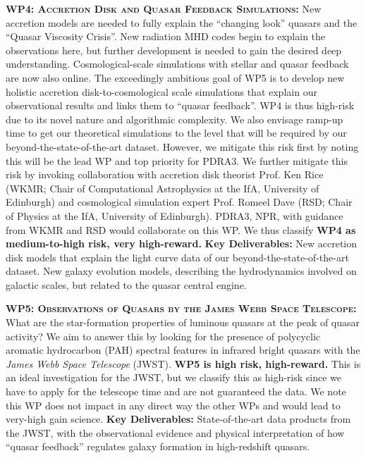 \documentclass[oneside, a4paper, onecolumn, 11pt]{article}
\begin{document}
\smallskip
\smallskip
\noindent
\textbf{\textsc{WP4: Accretion Disk and Quasar Feedback Simulations:}} 
New accretion models are needed to fully explain the ``changing look''
quasars and the ``Quasar Viscosity Crisis''. New radiation MHD codes
begin to explain the observations here, but further development is
needed to gain the desired deep understanding. Cosmological-scale
simulations with stellar and quasar feedback are now also online. The
exceedingly ambitious goal of WP5 is to develop new holistic accretion
disk-to-cosmological scale simulations that explain our observational
results and links them to ``quasar feedback''.  WP4 is thus high-risk
due to its novel nature and algorithmic complexity.  We also envisage
ramp-up time to get our theoretical simulations to the level that will
be required by our beyond-the-state-of-the-art dataset.  However, we
mitigate this risk first by noting this will be the lead WP and top
priority for PDRA3.  We further mitigate this risk by invoking
collaboration with accretion disk theorist Prof. Ken Rice (WKMR; Chair
of Computational Astrophysics at the IfA, University of Edinburgh) and
cosmological simulation expert Prof. Romeel Dave (RSD; Chair of
Physics at the IfA, University of Edinburgh).  PDRA3, NPR, with
guidance from WKMR and RSD would collaborate on this WP.  We thus
classify {\bf WP4 as medium-to-high risk, very high-reward.}  {\bf Key
Deliverables:} New accretion disk models that explain the light curve
data of our beyond-the-state-of-the-art dataset.  New galaxy evolution
models, describing the hydrodynamics involved on galactic scales, but
related to the quasar central engine.


\smallskip
\smallskip
\noindent
\textbf{\textsc{WP5: Observations of Quasars by the James Webb Space Telescope:}} 
What are the star-formation properties of luminous quasars at the peak
of quasar activity?  We aim to answer this by looking for the presence
of polycyclic aromatic hydrocarbon (PAH) spectral features in infrared
bright quasars with the {\it James Webb Space Telescope} (JWST).  {\bf
WP5 is high risk, high-reward.}  This is an ideal investigation for
the JWST, but we classify this as high-risk since we have to apply for
the telescope time and are not guaranteed the data.  We note this WP
does not impact in any direct way the other WPs and would lead to
very-high gain science.  {\bf Key Deliverables:} State-of-the-art data
products from the JWST, with the observational evidence and physical
interpretation of how ``quasar feedback'' regulates galaxy formation
in high-redshift quasars.
\end{document}
